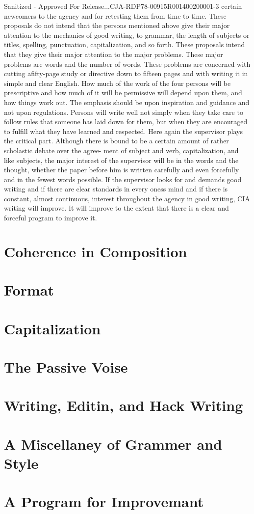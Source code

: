 \documentclass[
    oneside,
    11pt,
    draft
]{memoir}
\begin{document}
Sanitized - Approved For Release...CJA-RDP78-00915R001400200001-3 certain newcomers to the agency and for retesting them from time to time. These proposals do not intend that the persons mentioned above give their major attention to the mechanics of good writing, to grammar, the length of subjects or titles, spelling, punctuation, capitalization, and so forth. These proposals intend that they give their major attention to the major problems. These major problems are words and the number of words. These problems are concerned with cutting afifty-page study or directive down to fifteen pages and with writing it in simple and clear English. How much of the work of the four persons will be prescriptive and how much of it will be permissive will depend upon them, and how things work out. The emphasis should be upon inspiration and guidance and not upon regulations. Persons will write well not simply when they take care to follow rules that someone has laid down for them, but when they are encouraged to fulfill what they have learned and respected. Here again the supervisor plays the critical part. Although there is bound to be a certain amount of rather scholastic debate over the agree- ment of subject and verb, capitalization, and like subjects, the major interest of the supervisor will be in the words and the thought, whether the paper before him is written carefully and even forcefully and in the fewest words possible. If the supervisor looks for and demands good writing and if there are clear standards in every oness mind and if there is constant, almost continuous, interest throughout the agency in good writing, CIA writing will improve. It will improve to the extent that there is a clear and forceful program to improve it.

\chapter{Coherence in Composition}
\chapter{Format}
\chapter{Capitalization}
\chapter{The Passive Voise}
\chapter{Writing, Editin, and Hack Writing}
\chapter{A Miscellaney of Grammer and Style}
\chapter{A Program for Improvemant}
\end{document}
